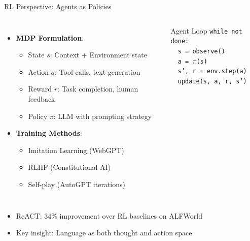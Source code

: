 \documentclass[aspectratio=169]{beamer}
\begin{document}
\begin{frame}{RL Perspective: Agents as Policies}
	\begin{columns}
		\begin{itemize}
			\item {\color{highlight}\textbf{MDP Formulation}}:
			\begin{itemize}
				\item State $s$: Context + Environment state
				\item Action $a$: Tool calls, text generation
				\item Reward $r$: Task completion, human feedback
				\item Policy $\pi$: LLM with prompting strategy
			\end{itemize}
			\item {\color{highlight}\textbf{Training Methods}}:
			\begin{itemize}
				\item Imitation Learning (WebGPT)
				\item RLHF (Constitutional AI)
				\item Self-play (AutoGPT iterations)
			\end{itemize}
		\end{itemize}
		
		\begin{block}{Agent Loop}
			\footnotesize
			\texttt{while not done:}\\
			\texttt{\ \ s = observe()}\\
			\texttt{\ \ a = $\pi$(s)}\\
			\texttt{\ \ s', r = env.step(a)}\\
			\texttt{\ \ update(s, a, r, s')}
		\end{block}
	\end{columns}
	
	\vspace{0.3cm}
	\begin{itemize}
		\item ReACT: 34\% improvement over RL baselines on ALFWorld
		\item Key insight: Language as both thought and action space
	\end{itemize}
\end{frame}
\end{document}
